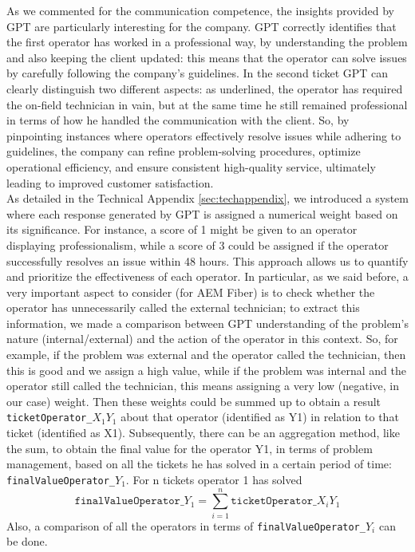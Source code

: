 As we commented for the communication competence, the insights provided by GPT are particularly interesting for the company. GPT correctly identifies that the first operator has worked in a professional way, by understanding the problem and also keeping the client updated: this means that the operator can solve issues by carefully following the company's guidelines. In the second ticket GPT can clearly distinguish two different aspects: as underlined, the operator has required the on-field technician in vain, but at the same time he still remained professional in terms of how he handled the communication with the client. So, by pinpointing instances where operators effectively resolve issues while adhering to guidelines, the company can refine problem-solving procedures, optimize operational efficiency, and ensure consistent high-quality service, ultimately leading to improved customer satisfaction.\\

As detailed in the Technical Appendix \ref{sec:techappendix}, we introduced a system where each response generated by GPT is assigned a numerical weight based on its significance. For instance, a score of 1 might be given to an operator displaying professionalism, while a score of 3 could be assigned if the operator successfully resolves an issue within 48 hours. This approach allows us to quantify and prioritize the effectiveness of each operator. In particular, as we said before, a very important aspect to consider (for AEM Fiber) is to check whether the operator has unnecessarily called the external technician; to extract this information, we made a comparison between GPT understanding of the problem's nature (internal/external) and the action of the operator in this context. So, for example, if the problem was external and the operator called the technician, then this is good and we assign a high value, while if the problem was internal and the operator still called the technician, this means assigning a very low (negative, in our case) weight. Then these weights could be summed up to obtain a  result \texttt{ticketOperator\_$X_1 Y_1$} about that operator (identified as Y1) in relation to that ticket (identified as X1). Subsequently, there can be an aggregation method, like the sum, to obtain the final value for the operator Y1, in terms of problem management, based on all the tickets he has solved in a certain period of time: \texttt{finalValueOperator\_$Y_1$}.  For n tickets operator 1 has solved
\begin{equation}
      \texttt{finalValueOperator\_$Y_1$} = \sum_{i=1}^{n} \texttt{ticketOperator\_$X_i Y_1$}
\end{equation}
Also, a comparison of all the operators in terms of \texttt{finalValueOperator\_$Y_i$} can be done.\\


